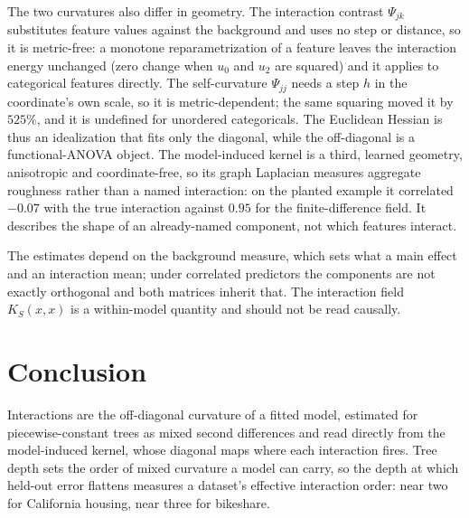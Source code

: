 \documentclass[11pt]{article}
\begin{document}
The two curvatures also differ in geometry. The interaction contrast $\Psi_{jk}$
substitutes feature values against the background and uses no step or distance, so
it is metric-free: a monotone reparametrization of a feature leaves the interaction
energy unchanged (zero change when $u_0$ and $u_2$ are squared) and it applies to
categorical features directly. The self-curvature $\Psi_{jj}$ needs a step $h$ in
the coordinate's own scale, so it is metric-dependent; the same squaring moved it
by $525\%$, and it is undefined for unordered categoricals. The Euclidean Hessian
is thus an idealization that fits only the diagonal, while the off-diagonal is a
functional-ANOVA object. The model-induced kernel is a third, learned geometry,
anisotropic and coordinate-free, so its graph Laplacian measures aggregate
roughness rather than a named interaction: on the planted example it correlated
$-0.07$ with the true interaction against $0.95$ for the finite-difference field.
It describes the shape of an already-named component, not which features interact.

The estimates depend on the background measure, which sets what a main effect and
an interaction mean; under correlated predictors the components are not exactly
orthogonal and both matrices inherit that. The interaction field
$K_S(x,x)$ is a within-model quantity and should not be read causally.

\section{Conclusion}

Interactions are the off-diagonal curvature of a fitted model, estimated for
piecewise-constant trees as mixed second differences and read directly from the
model-induced kernel, whose diagonal maps where each interaction fires. Tree depth
sets the order of mixed curvature a model can carry, so the depth at which
held-out error flattens measures a dataset's effective interaction order: near two
for California housing, near three for bikeshare.
\end{document}
